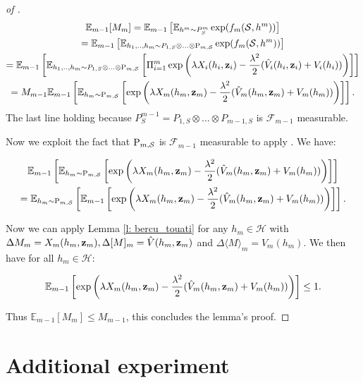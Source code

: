 \begin{noaddcontents}
\begin{proof}[of ]
    \begin{multline*}
      \mathbb{E}_{m-1}[M_m] =\mathbb{E}_{m-1}\left[\mathbb{E}_{h^m\sim P^m_S}\exp(f_m(\S,h^m))\right] \\
       = \mathbb{E}_{m-1}\left[\mathbb{E}_{h_1,..,h_m\sim P_{1,S}\otimes...\otimes \P_{m,\S}}\exp(f_m(\S,h^m))\right] \\
       = \mathbb{E}_{m-1}\left[\mathbb{E}_{h_1,..,h_m\sim P_{1,S}\otimes...\otimes \P_{m,\S}}\left[\Pi_{i=1}^m\exp\left(\lambda X_i(h_i,\z_i)  - \frac{\lambda^2}{2}(\hat{V}_i(h_i,\z_i) + V_i(h_i))\right)\right] \right] \\
        = M_{m-1} \mathbb{E}_{m-1}\left[ \mathbb{E}_{h_m\sim \P_{m,\S}}\left[\exp\left(\lambda X_m(h_m,\z_m)  - \frac{\lambda^2}{2}(\hat{V}_m(h_m,\z_m) + V_m(h_m))\right) \right]\right].
    \end{multline*}
The last line holding because $P^{m-1}_S = P_{1,S}\otimes...\otimes P_{m-1,S}$ is $\mathcal{F}_{m-1}$ measurable.


  Now we exploit the fact that $\P_{m,\S}$ is $\mathcal{F}_{m-1}$ measurable to apply . We have:

  \begin{multline*}
    \mathbb{E}_{m-1}\left[ \mathbb{E}_{h_m\sim \P_{m,\S}}\left[\exp\left(\lambda X_m(h_m,\z_m)  - \frac{\lambda^2}{2}(\hat{V}_m(h_m,\z_m) + V_m(h_m))\right) \right]\right] \\ =  \mathbb{E}_{h_m\sim \P_{m,\S}}\left[\mathbb{E}_{m-1}\left[\exp\left(\lambda X_m(h_m,\z_m)  - \frac{\lambda^2}{2}(\hat{V}_m(h_m,\z_m) + V_m(h_m))\right) \right]\right].
  \end{multline*}

Now we can apply Lemma \ref{l: bercu_touati} for any $h_m\in\mathcal{H}$ with $\Delta M_{m}=X_m(h_m,\z_m), \Delta[M]_{m}=\hat{V}(h_m,\z_m)$ and $\Delta\langle M\rangle_{m}= V_m(h_m)$. We then have for all $h_m\in\mathcal{H}$:

\[ \mathbb{E}_{m-1}\left[\exp\left(\lambda X_m(h_m,\z_m)  - \frac{\lambda^2}{2}(\hat{V}_m(h_m,\z_m) + V_m(h_m))\right) \right] \leq 1.  \]

Thus $\mathbb{E}_{m-1}[M_m] \leq M_{m-1}$, this concludes the lemma's proof.
  \end{proof}


\section{Additional experiment}
\label{sec: error_bars}


\end{noaddcontents}
